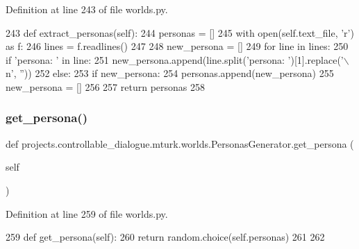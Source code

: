 Definition at line 243 of file worlds.\+py.


\begin{DoxyCode}
243     \textcolor{keyword}{def }extract\_personas(self):
244         personas = []
245         with open(self.text\_file, \textcolor{stringliteral}{'r') as f:}
246 \textcolor{stringliteral}{            lines = f.readlines()}
247 \textcolor{stringliteral}{}
248 \textcolor{stringliteral}{        new\_persona = []}
249 \textcolor{stringliteral}{        }\textcolor{keywordflow}{for} line \textcolor{keywordflow}{in} lines:
250             \textcolor{keywordflow}{if} \textcolor{stringliteral}{'persona: '} \textcolor{keywordflow}{in} line:
251                 new\_persona.append(line.split(\textcolor{stringliteral}{'persona: '})[1].replace(\textcolor{stringliteral}{'\(\backslash\)n'}, \textcolor{stringliteral}{''}))
252             \textcolor{keywordflow}{else}:
253                 \textcolor{keywordflow}{if} new\_persona:
254                     personas.append(new\_persona)
255                     new\_persona = []
256 
257         \textcolor{keywordflow}{return} personas
258 
\end{DoxyCode}
\mbox{\label{classprojects_1_1controllable__dialogue_1_1mturk_1_1worlds_1_1PersonasGenerator_a788311f725f83f4f6da141df5241ca11}} 
\subsubsection{\texorpdfstring{get\+\_\+persona()}{get\_persona()}}
{\footnotesize\ttfamily def projects.\+controllable\+\_\+dialogue.\+mturk.\+worlds.\+Personas\+Generator.\+get\+\_\+persona (\begin{DoxyParamCaption}\item[{}]{self }\end{DoxyParamCaption})}



Definition at line 259 of file worlds.\+py.


\begin{DoxyCode}
259     \textcolor{keyword}{def }get\_persona(self):
260         \textcolor{keywordflow}{return} random.choice(self.personas)
261 
262 
\end{DoxyCode}


